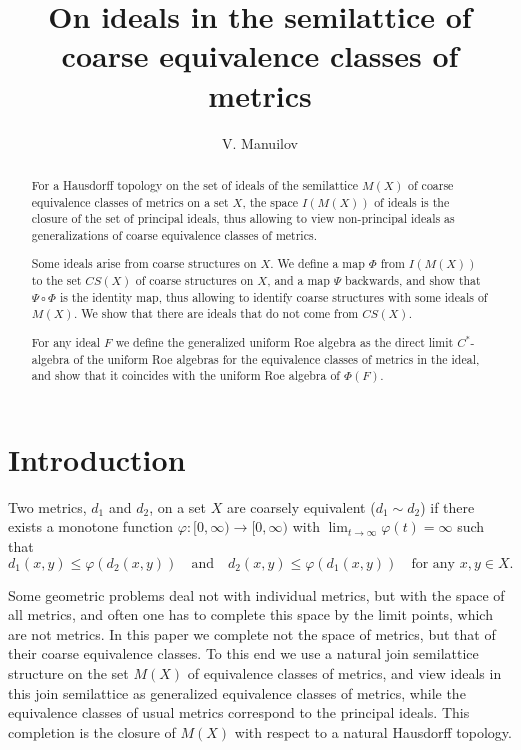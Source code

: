 \documentclass[reqno,12pt]{amsart}
\author{V. Manuilov}
\date{}
\title{On ideals in the semilattice of coarse equivalence classes of metrics}
\theoremstyle{plain}%
\theoremstyle{definition}
\theoremstyle{remark}
\numberwithin{equation}{section}
\begin{document}
\begin{abstract}
For a Hausdorff topology on the set of ideals of the semilattice $M(X)$ of coarse equivalence classes of metrics on a set $X$, the space $I(M(X))$ of ideals is the closure of the set of principal ideals, thus allowing to view non-principal ideals as generalizations of coarse equivalence classes of metrics. 

Some ideals arise from coarse structures on $X$. We define a map $\Phi$ from $I(M(X))$ to the set $CS(X)$ of coarse structures on $X$, and a map $\Psi$ backwards, and show that $\Psi\circ\Phi$ is the identity map, thus allowing to identify coarse structures with some ideals of $M(X)$. We show that there are ideals that do not come from $CS(X)$.


For any ideal $F$ we define the generalized uniform Roe algebra as the direct limit $C^*$-algebra of the uniform Roe algebras for the equivalence classes of metrics in the ideal, and show that it coincides with the uniform Roe algebra of $\Phi(F)$.
\end{abstract}

\maketitle

\section{Introduction}


Two metrics, $d_1$ and $d_2$, on a set $X$ are coarsely equivalent ($d_1\sim d_2$) if there exists a monotone function $\varphi:[0,\infty)\to[0,\infty)$ with $\lim_{t\to\infty}\varphi(t)=\infty$ such that 
$$
d_1(x,y)\leq\varphi(d_2(x,y)) \quad\mbox{and}\quad d_2(x,y)\leq\varphi(d_1(x,y))\quad \mbox{for\ any\ }x,y\in X. 
$$

Some geometric problems deal not with individual metrics, but with the space of all metrics, and often one has to complete this space by the limit points, which are not metrics. In this paper we complete not the space of metrics, but that of their coarse equivalence classes. To this end we use a natural join semilattice structure on the set $M(X)$ of equivalence classes of metrics, and view ideals in this join semilattice as generalized equivalence classes of metrics, while the equivalence classes of usual metrics correspond to the principal ideals. This completion is the closure of $M(X)$ with respect to a natural Hausdorff topology.
\end{document}

